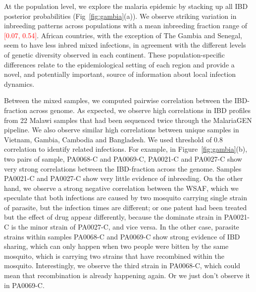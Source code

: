 \documentclass{article}
\begin{document}
At the population level, we explore the malaria epidemic by stacking up all IBD posterior probabilities (Fig~\ref{fig:gambia}(a)). We observe striking variation in inbreeding patterns across populations with a mean inbreeding fraction range of \textcolor{red}{[0.07, 0.54]}. African countries, with the exception of The Gambia and Senegal, seem to have less inbred mixed infections, in agreement with the different levels of genetic diversity observed in each continent. These population-specific differences relate to the epidemiological setting of each region and provide a novel, and potentially important, source of information about local infection dynamics.

Between the mixed samples, we computed pairwise correlation between the IBD-fraction across genome. As expected, we observe high correlations in IBD profiles from 22 Malawi samples that had been sequenced twice through the MalariaGEN pipeline. We also observe similar high correlations between unique samples in Vietnam, Gambia, Cambodia and Bangladesh. We used threshold of 0.8 correlation to identify related infections. For example, in Figure~\ref{fig:gambia}(b), two pairs of sample, PA0068-C and PA0069-C, PA0021-C and PA0027-C show very strong correlations between the IBD-fraction across the genome. Samples PA0021-C and PA0027-C show very little evidence of inbreeding. On the other hand, we observe a strong negative correlation between the WSAF, which we speculate that both infections are caused by two mosquito carrying single strain of parasite, but the infection times are different; or one patent had been treated but the effect of drug appear differently, because the dominate strain in PA0021-C is the minor strain of PA0027-C, and vice versa. In the other case, parasite strains within samples PA0068-C and PA0069-C show strong evidence of IBD sharing, which can only happen when two people were bitten by the same mosquito, which is carrying two strains that have recombined within the mosquito. Interestingly, we observe the third strain in PA0068-C, which could mean that recombination is already happening again. Or we just don't observe it in PA0069-C.



\end{document}
